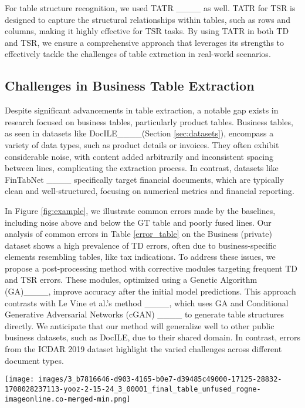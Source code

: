 For table structure recognition, we used TATR ____ as well. TATR for TSR is designed to capture the structural relationships within tables, such as rows and columns, making it highly effective for TSR tasks. By using TATR in both TD and TSR, we ensure a comprehensive approach that leverages its strengths to effectively tackle the challenges of table extraction in real-world scenarios.

\subsection{Challenges in Business Table Extraction}


Despite significant advancements in table extraction, a notable gap exists in research focused on business tables, particularly product tables. Business tables, as seen in datasets like DocILE____(Section \ref{sec:datasets}), encompass a variety of data types, such as product details or invoices. They often exhibit considerable noise, with content added arbitrarily and inconsistent spacing between lines, complicating the extraction process. In contrast, datasets like FinTabNet ____ specifically target financial documents, which are typically clean and well-structured, focusing on numerical metrics and financial reporting. 

In Figure \ref{fig:example}, we illustrate common errors made by the baselines, including noise above and below the GT table and poorly fused lines. Our analysis of common errors in Table \ref{error_table} on the Business (private) dataset shows a high prevalence of TD errors, often due to business-specific elements resembling tables, like tax indications. To address these issues, we propose a post-processing method with corrective modules targeting frequent TD and TSR errors. These modules, optimized using a Genetic Algorithm (GA)____, improve accuracy after the initial model predictions. This approach contrasts with Le Vine et al.'s method ____, which uses GA and Conditional Generative Adversarial Networks (cGAN) ____ to generate table structures directly. We anticipate that our method will generalize well to other public business datasets, such as DocILE, due to their shared domain. In contrast, errors from the ICDAR 2019 dataset highlight the varied challenges across different document types.


\begin{figure*}[t]
  \centering
   \texttt{[image: images/3\_b7816646-d903-4165-b0e7-d39485c49000-17125-28832-1708028237113-yooz-2-15-24\_3\_00001\_final\_table\_unfused\_rogne-imageonline.co-merged-min.png]}

   \caption{Baseline prediction VS Ground-Truth on anonymised private data. Common errors (on the left) generally include mistakes in line fusion and over detected cells that can be seen as noise for the structure recognition step.}
   \label{fig:example}
\end{figure*}